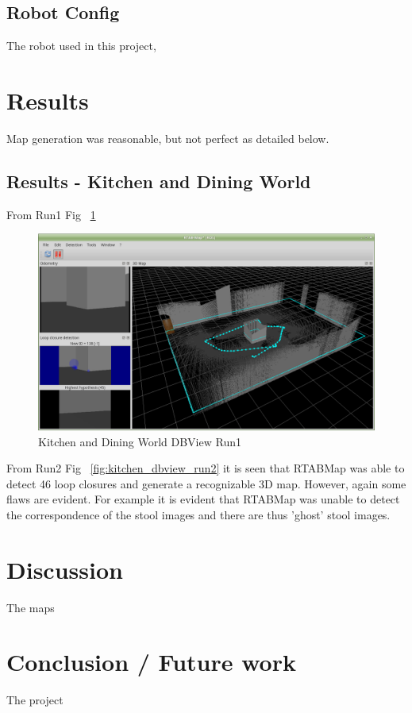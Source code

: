 \documentclass[10pt,journal,compsoc]{IEEEtran}
\begin{document}
\subsection{Robot Config}
The robot used in this project,

\section{Results}
Map generation was reasonable, but not perfect as detailed below.
\subsection{Results - Kitchen and Dining World}
From Run1 Fig ~\ref{fig:kitchen_dbview_run1} 

\begin{figure}[h]
      \centering
      \includegraphics[width=\linewidth]{Assets/rtabviz_simpleRect_2019-02-11_19-04-25.png}
      \caption{Kitchen and Dining World DBView Run1}
      \label{fig:kitchen_dbview_run1}
\end{figure}

From Run2 Fig ~\ref{fig:kitchen_dbview_run2} it is seen that RTABMap was able to detect 46 loop closures and generate a recognizable 3D map. However, again some flaws are evident. For example it is evident that RTABMap was unable to detect the correspondence of the stool images and there are thus 'ghost' stool images.

\section{Discussion}
The maps

\section{Conclusion / Future work}
The project 
\end{document}
